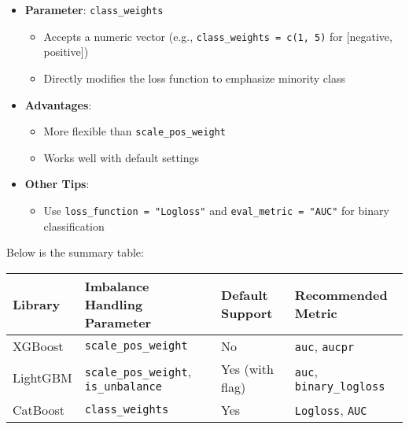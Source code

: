 \documentclass[
  letterpaper,
  DIV=11,
  numbers=noendperiod]{scrreprt}
\providecommand{\tightlist}{%
  \setlength{\itemsep}{0pt}\setlength{\parskip}{0pt}}\usepackage{longtable,booktabs,array}
\begin{document}
\begin{itemize}
\tightlist
\item
  \textbf{Parameter}: \texttt{class\_weights}

  \begin{itemize}
  \tightlist
  \item
    Accepts a numeric vector (e.g., \texttt{class\_weights\ =\ c(1,\ 5)}
    for {[}negative, positive{]})
  \item
    Directly modifies the loss function to emphasize minority class
  \end{itemize}
\item
  \textbf{Advantages}:

  \begin{itemize}
  \tightlist
  \item
    More flexible than \texttt{scale\_pos\_weight}
  \item
    Works well with default settings
  \end{itemize}
\item
  \textbf{Other Tips}:

  \begin{itemize}
  \tightlist
  \item
    Use \texttt{loss\_function\ =\ "Logloss"} and
    \texttt{eval\_metric\ =\ "AUC"} for binary classification
  \end{itemize}
\end{itemize}

Below is the summary table:

\begin{longtable}[]{@{}
  >{\raggedright\arraybackslash}p{}
  >{\raggedright\arraybackslash}p{}
  >{\raggedright\arraybackslash}p{}
  >{\raggedright\arraybackslash}p{}@{}}
\toprule\noalign{}
\begin{minipage}[b]{\linewidth}\raggedright
Library
\end{minipage} & \begin{minipage}[b]{\linewidth}\raggedright
Imbalance Handling Parameter
\end{minipage} & \begin{minipage}[b]{\linewidth}\raggedright
Default Support
\end{minipage} & \begin{minipage}[b]{\linewidth}\raggedright
Recommended Metric
\end{minipage} \\
\midrule\noalign{}
\endhead
\bottomrule\noalign{}
\endlastfoot
XGBoost & \texttt{scale\_pos\_weight} & No & \texttt{auc},
\texttt{aucpr} \\
LightGBM & \texttt{scale\_pos\_weight}, \texttt{is\_unbalance} & Yes
(with flag) & \texttt{auc}, \texttt{binary\_logloss} \\
CatBoost & \texttt{class\_weights} & Yes & \texttt{Logloss},
\texttt{AUC} \\
\end{longtable}
\end{document}
